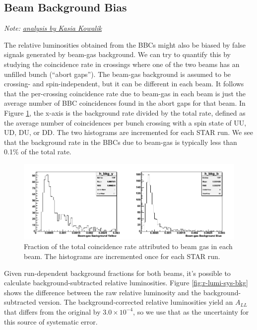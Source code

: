 \subsection{Beam Background Bias}

\textit{Note: \href{http://www.star.bnl.gov/protected/spin/kowalik/2005/r-lumi/bkg_sys.html}{analysis by Kasia Kowalik}}

The relative luminosities obtained from the BBCs might also be biased by false
signals generated by beam-gas background. We can try to quantify this by
studying the coincidence rate in crossings where one of the two beams has an
unfilled bunch (``abort gaps''). The beam-gas background is assumed to be
crossing- and spin-independent, but it can be different in each beam. It
follows that the per-crossing coincidence rate due to beam-gas in each beam is
just the average number of BBC coincidences found in the abort gaps for that
beam. In Figure \ref{fig:bkg-yellow-blue}, the x-axis is the background rate
divided by the total rate, defined as the average number of coincidences per
bunch crossing with a spin state of UU, UD, DU, or DD. The two histograms are
incremented for each STAR run. We see that the background rate in the BBCs due
to beam-gas is typically less than 0.1\% of the total rate.

\begin{figure}
  \includegraphics[width=1.0\textwidth]{figures/bkg-yellow-blue}
  \caption{Fraction of the total coincidence rate attributed to beam gas in
  each beam. The histograms are incremented once for each STAR run.}
  \label{fig:bkg-yellow-blue}
\end{figure}

Given run-dependent background fractions for both beams, it's possible to
calculate background-subtracted relative luminosities. Figure
\ref{fig:r-lumi-sys-bkg} shows the difference between the raw relative
luminosity and the background-subtracted version. The background-corrected
relative luminosities yield an $A_{LL}$ that differs from the original by
$3.0\times10^{-4}$, so we use that as the uncertainty for this source of
systematic error.

